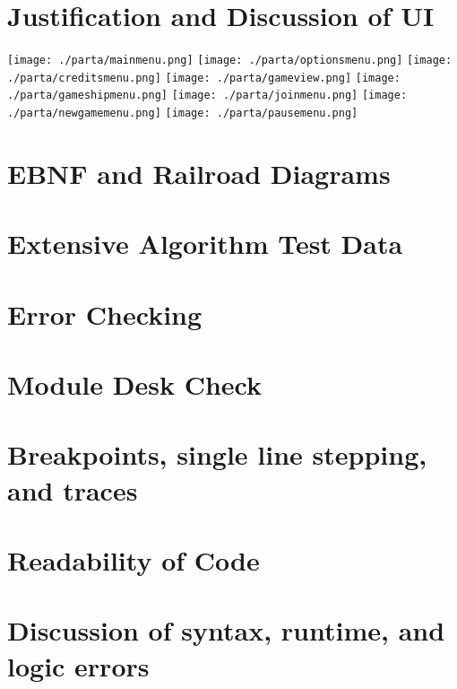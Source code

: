 \documentclass[12pt, DIV=calc]{scrartcl}
\begin{document}
\clearpage
\section{Justification and Discussion of UI}

\texttt{[image: ./parta/mainmenu.png]}
\texttt{[image: ./parta/optionsmenu.png]}
\texttt{[image: ./parta/creditsmenu.png]}
\texttt{[image: ./parta/gameview.png]}
\texttt{[image: ./parta/gameshipmenu.png]}
\texttt{[image: ./parta/joinmenu.png]}
\texttt{[image: ./parta/newgamemenu.png]}
\texttt{[image: ./parta/pausemenu.png]}



\clearpage
\section{EBNF and Railroad Diagrams}

\clearpage
\section{Extensive Algorithm Test Data}

\clearpage
\section{Error Checking}

\clearpage
\section{Module Desk Check}

\clearpage
\section{Breakpoints, single line stepping, and traces}

\clearpage
\section{Readability of Code}

\clearpage
\section{Discussion of syntax, runtime, and logic errors}
\end{document}
